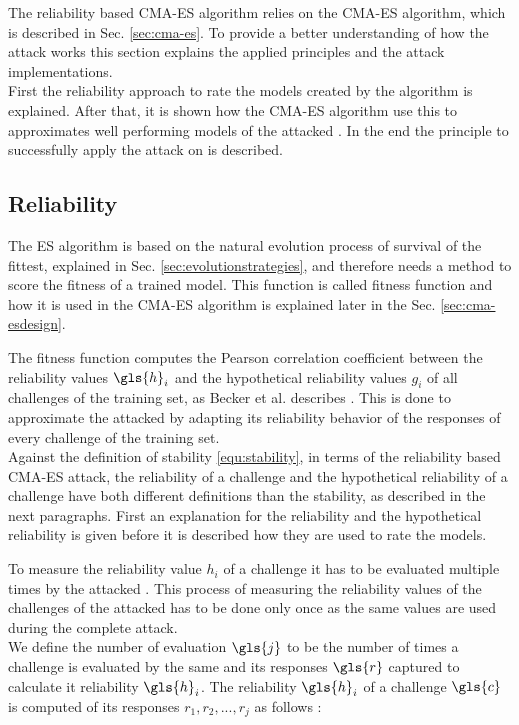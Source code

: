 The reliability based \ac{CMA-ES} algorithm relies on the \ac{CMA-ES} algorithm, which is described in Sec. \ref{sec:cma-es}.
To provide a better understanding of how the attack works this section explains the applied principles and the attack implementations.\\
First the reliability approach to rate the models created by the algorithm is explained.
After that, it is shown how the \ac{CMA-ES} algorithm use this to approximates well performing models of the attacked \apuf.
In the end the principle to successfully apply the attack on \xpufs is described.


\subsection{Reliability}
\label{sec:reliability}

The \ac{ES} algorithm is based on the natural evolution process of survival of the fittest, explained in Sec. \ref{sec:evolutionstrategies}, and therefore needs a method to score the fitness of a trained model.
This function is called fitness function and how it is used in the \ac{CMA-ES} algorithm is explained later in the Sec. \ref{sec:cma-esdesign}.

The fitness function computes the Pearson correlation coefficient between the reliability values $\gls{h}_i$ and the hypothetical reliability values $g_i$ of all challenges of the training set, as Becker et al. describes \cite{Becker2015ThePUFs}.
This is done to approximate the attacked \puf by adapting its reliability behavior of the responses of every challenge of the training set.\\
Against the definition of stability \ref{equ:stability}, in terms of the reliability based \ac{CMA-ES} attack, the reliability of a challenge and the hypothetical reliability of a challenge have both different definitions than the stability, as described in the next paragraphs. 
First an explanation for the reliability and the hypothetical reliability is given before it is described how they are used to rate the models.

To measure the reliability value $h_i$ of a challenge it has to be evaluated multiple times by the attacked \puf.
This process of measuring the reliability values of the challenges of the attacked \puf has to be done only once as the same values are used during the complete attack.\\
We define the number of evaluation $\gls{j}$ to be the number of times a challenge is evaluated by the same \puf and its responses $\gls{r}$ captured to calculate it reliability $\gls{h}_i$.
The reliability $\gls{h}_i$ of a challenge $\gls{c}$ is computed of its responses $r_1, r_2, ..., r_j$ as follows \cite{Becker2015ThePUFs}:

